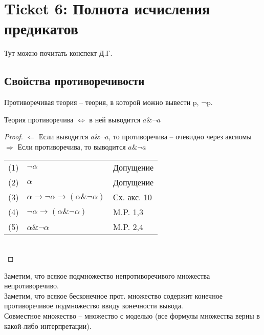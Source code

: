 \section{Ticket 6: Полнота исчисления предикатов}
Тут можно почитать конспект Д.Г.
\subsection{Свойства противоречивости}
Противоречивая теория – теория, в которой можно вывести p, ¬p.
\begin{lemma}
Теория противоречива $\Leftrightarrow$ в ней выводится $a \& \neg a$
\end{lemma}
\begin{proof}
$\Leftarrow$ Если выводится $a \& \neg a$, то противоречива -- очевидно через аксиомы\\
$\Rightarrow$ Если противоречива, то выводится $a \& \neg a$\\
\begin{tabular}{lll}
(1)& $\neg \alpha$& Допущение\\
(2)& $\alpha$& Допущение\\
(3)& $\alpha \to \neg \alpha \to (\alpha \& \neg \alpha)$& Сх. акс. 10\\
(4)& $\neg \alpha \to (\alpha \& \neg \alpha)$& M.P. 1,3\\
(5)& $\alpha \& \neg \alpha$& M.P. 2,4\\
\end{tabular}\\
\end{proof}
Заметим, что всякое подмножество непротиворечивого множества непротиворечиво.\\
Заметим, что всякое бесконечное прот. множество содержит конечное противоречивое подмножество ввиду конечности вывода.\\
Совместное множество – множество с моделью (все формулы множества верны в какой-либо интерпретации).